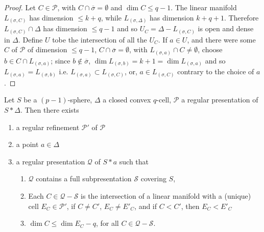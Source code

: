 \begin{proof}
Let $C\in\mathscr{P}$, with $C\cap \overline{\sigma}=\emptyset$ and $\dim C\leq q-1$. The linear manifold $L_{(\sigma,C)}$ has dimension $\leq k+q$, while $L_{(\sigma,\Delta)}$ has dimension $k+q+1$. Therefore $L_{(\sigma,C)}\cap \Delta$ has dimension $\leq q-1$ and so $U_{C}=\Delta-L_{(\sigma,C)}$ is open and dense in $\Delta$. Define $U$ to\pageoriginale be the intersection of all the $U_{C}$. If $a\in U$, and there were some $C$ of $\mathscr{P}$ of dimension $\leq q-1$, $C\cap \overline{\sigma}=\emptyset$, with $L_{(\sigma,a)}\cap C\neq \emptyset$, choose $b\in C\cap L_{(\sigma,a)}$; since $b\not\in \overline{\sigma}$, $\dim L_{(\sigma,b)}=k+1=\dim L_{(\sigma,a)}$ and so $L_{(\sigma,a)}=L_{(\sigma,b)}$ i.e. $L_{(\sigma,a)}\subset L_{(\sigma,C)}$, or, $a\in L_{(\sigma,C)}$ contrary to the choice of $a$.
\end{proof}

\begin{proposition}\label{chap5-prop5.4.9}
Let $S$ be a $(p-1)$-sphere, $\Delta$ a closed convex $q$-cell, $\mathscr{P}$ a regular presentation of $S\ast\Delta$. Then there exists
\begin{enumerate}
\renewcommand{\labelenumi}{\rm(\theenumi)}
\item a regular refinement $\mathscr{P}'$ of $\mathscr{P}$

\item a point $a\in \Delta$

\item a regular presentation $\mathcal{Q}$ of $S\ast a$ such that
\begin{enumerate}
\renewcommand{\theenumii}{\alph{enumii}}
\renewcommand{\labelenumii}{\rm(\theenumii)}
\item $\mathcal{Q}$ contains a full subpresentation $\mathscr{S}$ covering $S$,

\item Each $C\in \mathcal{Q}-\mathscr{S}$ is the intersection of a linear manifold with a (unique) cell $E_{C}\in\mathscr{P}'$, if $C\neq C'$, $E_{C}\neq E'_{C}$, and if $C<C'$, then $E_{C}<E'_{C}$

\item $\dim C\leq \dim E_{C}-q$, for all $C\in \mathcal{Q}-\mathscr{S}$.
\end{enumerate}
\end{enumerate}
\end{proposition}

